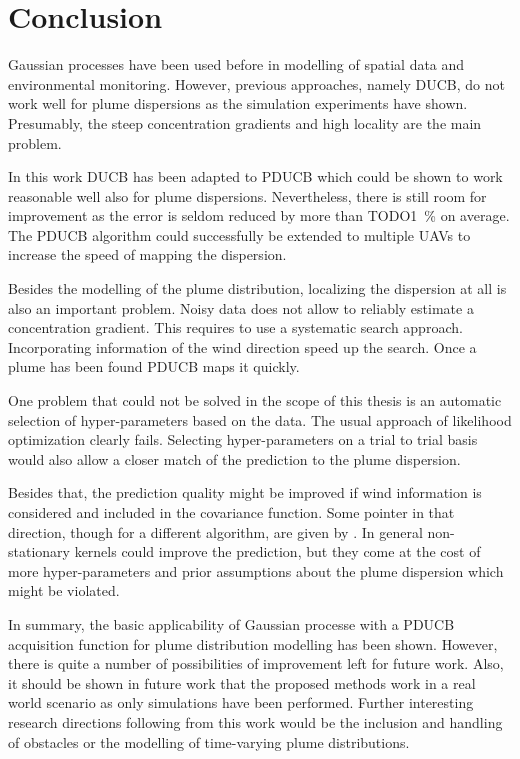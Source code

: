 \chapter{Conclusion}
Gaussian processes have been used before in modelling of spatial data and 
environmental monitoring. However, previous approaches, namely DUCB, do not work 
well for plume dispersions as the simulation experiments have shown. Presumably, 
the steep concentration gradients and high locality are the main problem.

In this work DUCB has been adapted to PDUCB which could be shown to work 
reasonable well also for plume dispersions. Nevertheless, there is still room 
for improvement as the error is seldom reduced by more than TODO\SI{1}{\percent} 
on average. The PDUCB algorithm could successfully be extended to multiple UAVs 
to increase the speed of mapping the dispersion.

Besides the modelling of the plume distribution, localizing the dispersion at 
all is also an important problem. Noisy data does not allow to reliably estimate 
a concentration gradient. This requires to use a systematic search approach.  
Incorporating information of the wind direction speed up the search. Once 
a plume has been found PDUCB maps it quickly.

One problem that could not be solved in the scope of this thesis is an automatic 
selection of hyper-parameters based on the data. The usual approach of 
likelihood optimization clearly fails. Selecting hyper-parameters on a trial to 
trial basis would also allow a closer match of the prediction to the plume 
dispersion.

Besides that, the prediction quality might be improved if wind information is 
considered and included in the covariance function. Some pointer in that 
direction, though for a different algorithm, are given by 
\textcite{Reggente:2009ti}. In general non-stationary kernels could improve the 
prediction, but they come at the cost of more hyper-parameters and prior 
assumptions about the plume dispersion which might be violated.

In summary, the basic applicability of Gaussian processe with a PDUCB 
acquisition function for plume distribution modelling has been shown. However, 
there is quite a number of possibilities of improvement left for future work.  
Also, it should be shown in future work that the proposed methods work in a real 
world scenario as only simulations have been performed. Further interesting 
research directions following from this work would be the inclusion and handling 
of obstacles or the modelling of time-varying plume distributions.

